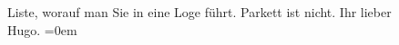 \begin{ledgroupsized}[t]{13cm}
               Liste, worauf man Sie in eine Loge führt. Parkett ist nicht.\pend
           \pstart
           Ihr lieber{\\[\baselineskip]}\spacefill\mbox{Hugo.}\pend
           \leftskip=0em{}
         
         \endnumbering{}\end{ledgroupsized}  \newcommand{\dateiname}{L01831}\newcommand{\titel}{Hugo von Hofmannsthal an Arthur Schnitzler, 19. 3. [1909]}\newcommand{\editorInnen}{Martin Anton Müller und Gerd-Hermann Susen}
      